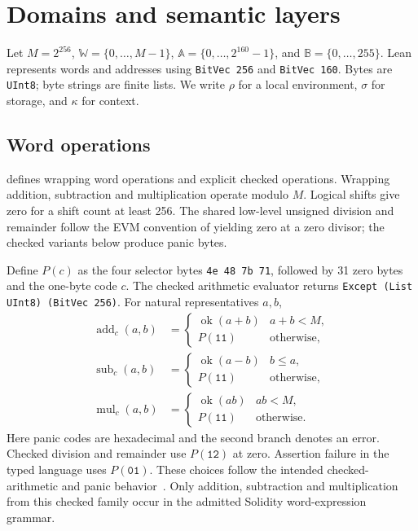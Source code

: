 \documentclass[conference]{IEEEtran}
\newcommand{\W}{\mathbb W}
\newcommand{\code}[1]{\texttt{#1}}
\begin{document}
\section{Domains and semantic layers}
Let $M=2^{256}$, $\W=\{0,\ldots,M-1\}$, $\mathbb A=\{0,\ldots,2^{160}-1\}$,
and $\mathbb B=\{0,\ldots,255\}$. Lean represents words and addresses using
\code{BitVec 256} and \code{BitVec 160}. Bytes are \code{UInt8}; byte strings
are finite lists. We write $\rho$ for a local environment, $\sigma$ for storage,
and $\kappa$ for context.



\subsection{Word operations}
 defines wrapping word operations and explicit
checked operations. Wrapping addition, subtraction and multiplication operate
modulo $M$. Logical shifts give zero for a shift count at least 256. The shared
low-level unsigned division and remainder follow the EVM convention of yielding
zero at a zero divisor; the checked variants below produce panic bytes.

Define $P(c)$ as the four selector bytes \code{4e 48 7b 71}, followed by 31
zero bytes and the one-byte code $c$. The checked arithmetic evaluator returns
\code{Except (List UInt8) (BitVec 256)}. For natural representatives $a,b$,
\begin{align*}
 \operatorname{add}_{c}(a,b)&=
 \begin{cases}\operatorname{ok}(a+b)&a+b<M,\\P(\code{11})&\text{otherwise},\end{cases}\\
 \operatorname{sub}_{c}(a,b)&=
 \begin{cases}\operatorname{ok}(a-b)&b\leq a,\\P(\code{11})&\text{otherwise},\end{cases}\\
 \operatorname{mul}_{c}(a,b)&=
 \begin{cases}\operatorname{ok}(ab)&ab<M,\\P(\code{11})&\text{otherwise}.\end{cases}
\end{align*}
Here panic codes are hexadecimal and the second branch denotes an error.
Checked division and remainder use $P(\code{12})$ at
zero. Assertion failure in the typed language uses $P(\code{01})$. These choices
follow the intended checked-arithmetic and panic behavior~\cite{control}.
Only addition, subtraction and multiplication from this checked family occur
in the admitted Solidity word-expression grammar.
\end{document}
